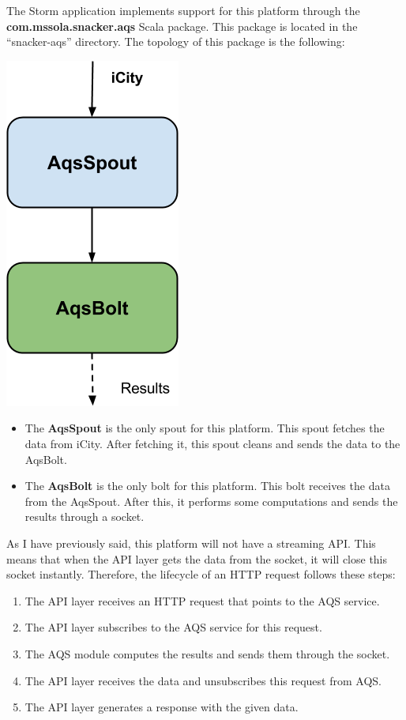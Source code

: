 The Storm application implements support for this platform through the {\bf
com.mssola.snacker.aqs} Scala package. This package is located in the
``snacker-aqs'' directory. The topology of this package is the following:

\begin{center}
  \includegraphics[scale=0.6]{implementation/images/aqs.png}
\end{center}

\begin{itemize}
  \itemsep0em
  \item The {\bf AqsSpout} is the only spout for this platform. This spout
fetches the data from iCity. After fetching it, this spout cleans and sends the
data to the AqsBolt.
  \item The {\bf AqsBolt} is the only bolt for this platform. This bolt
receives the data from the AqsSpout. After this, it performs some computations
and sends the results through a socket.
\end{itemize}

As I have previously said, this platform will not have a streaming API. This
means that when the API layer gets the data from the socket, it will close this
socket instantly. Therefore, the lifecycle of an HTTP request follows these
steps:

\begin{enumerate}
  \itemsep0em
  \item The API layer receives an HTTP request that points to the AQS service.
  \item The API layer subscribes to the AQS service for this request.
  \item The AQS module computes the results and sends them through the socket.
  \item The API layer receives the data and unsubscribes this request from AQS.
  \item The API layer generates a response with the given data.
\end{enumerate}

